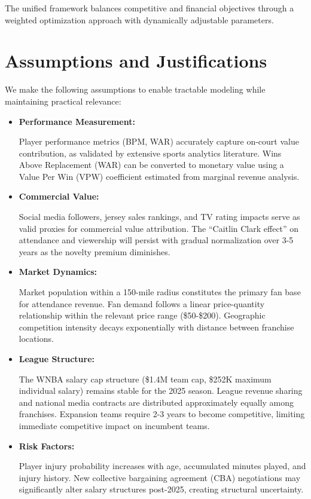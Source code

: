 \documentclass{mcmthesis}
\begin{document}
The unified framework balances competitive and financial objectives through a weighted optimization approach with dynamically adjustable parameters.

\section{Assumptions and Justifications}

We make the following assumptions to enable tractable modeling while maintaining practical relevance:

\begin{itemize}
\item \textbf{Performance Measurement:}

Player performance metrics (BPM, WAR) accurately capture on-court value contribution, as validated by extensive sports analytics literature.
Wins Above Replacement (WAR) can be converted to monetary value using a Value Per Win (VPW) coefficient estimated from marginal revenue analysis.


\item \textbf{Commercial Value:}

Social media followers, jersey sales rankings, and TV rating impacts serve as valid proxies for commercial value attribution.
The ``Caitlin Clark effect'' on attendance and viewership will persist with gradual normalization over 3-5 years as the novelty premium diminishes.


\item \textbf{Market Dynamics:}

Market population within a 150-mile radius constitutes the primary fan base for attendance revenue.
Fan demand follows a linear price-quantity relationship within the relevant price range (\$50-\$200).
Geographic competition intensity decays exponentially with distance between franchise locations.


\item \textbf{League Structure:}

The WNBA salary cap structure (\$1.4M team cap, \$252K maximum individual salary) remains stable for the 2025 season.
 League revenue sharing and national media contracts are distributed approximately equally among franchises.
 Expansion teams require 2-3 years to become competitive, limiting immediate competitive impact on incumbent teams.


\item \textbf{Risk Factors:}

 Player injury probability increases with age, accumulated minutes played, and injury history.
 New collective bargaining agreement (CBA) negotiations may significantly alter salary structures post-2025, creating structural uncertainty.

\end{itemize}
\end{document}
